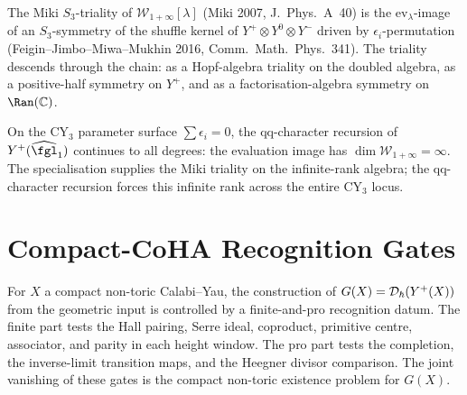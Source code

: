 \begin{remark}
\label{rem:coha-miki-triality}
The Miki $S_{3}$-triality of $\mathcal W_{1+\infty}[\lambda]$ (Miki
2007, J.\ Phys.\ A~40) is the $\mathrm{ev}_{\lambda}$-image of an
$S_{3}$-symmetry of the shuffle kernel of $Y^{+} \otimes Y^{0} \otimes
Y^{-}$ driven by $\epsilon_{i}$-permutation (Feigin--Jimbo--Miwa--Mukhin
2016, Comm.\ Math.\ Phys.~341). The triality descends through the
chain: as a Hopf-algebra triality on the doubled algebra, as a
positive-half symmetry on $Y^{+}$, and as a factorisation-algebra
symmetry on $\Ran(\mathbb C)$.
\end{remark}

\begin{remark}[The CY$_3$ specialisation $\sum \epsilon_i = 0$ supplies Miki triality at infinite rank]
\label{rem:coha-cy3-no-truncation}
On the CY$_3$ parameter surface $\sum \epsilon_i = 0$, the qq-character
recursion of $Y^{+}(\widehat{\fgl}_1)$ continues to all degrees: the
evaluation image has $\dim \mathcal W_{1 + \infty} = \infty$. The
specialisation supplies the Miki triality on the infinite-rank
algebra; the qq-character recursion forces this infinite rank across
the entire CY$_3$ locus.
\end{remark}

\section{Compact-CoHA Recognition Gates}
\label{sec:bulk-compact-coha-gates}

For $X$ a compact non-toric Calabi--Yau, the construction of
$G(X) = \mathcal D_{\hbar}(Y^{+}(X))$ from the geometric input
is controlled by a finite-and-pro recognition datum. The finite part
tests the Hall pairing, Serre ideal, coproduct, primitive centre,
associator, and parity in each height window. The pro part tests the
completion, the inverse-limit transition maps, and the Heegner divisor
comparison. The joint vanishing of these gates is the compact non-toric
existence problem for $G(X)$.

